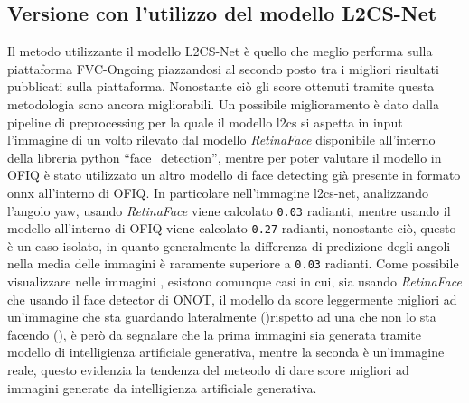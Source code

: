 \documentclass[12pt,a4paper,openright,twoside]{book}
\begin{document}
\subsection{Versione con l'utilizzo del modello L2CS-Net}
Il metodo utilizzante il modello L2CS-Net è quello che meglio performa sulla piattaforma FVC-Ongoing piazzandosi al secondo posto tra i migliori risultati pubblicati sulla piattaforma. Nonostante ciò gli score ottenuti tramite questa metodologia sono ancora migliorabili. Un possibile miglioramento è dato dalla pipeline di preprocessing per la quale il modello l2cs si aspetta in input l'immagine di un volto rilevato dal modello \textit{RetinaFace} disponibile all'interno della libreria python ``face\_detection'', mentre per poter valutare il modello in OFIQ è stato utilizzato un altro modello di face detecting già presente in formato onnx all'interno di OFIQ.
In particolare nell'immagine  l2cs-net, analizzando l'angolo yaw, usando \textit{RetinaFace} viene calcolato \texttt{0.03} radianti, mentre usando il modello all'interno di OFIQ viene calcolato \texttt{0.27} radianti, nonostante ciò, questo è un caso isolato, in quanto generalmente la differenza di predizione degli angoli nella media delle immagini è raramente superiore a \texttt{0.03} radianti.
Come possibile visualizzare nelle immagini , esistono comunque casi in cui, sia usando \textit{RetinaFace} che usando il face detector di ONOT, il modello da score leggermente migliori ad un'immagine che sta guardando lateralmente ()rispetto ad una che non lo sta facendo (), è però da segnalare che la prima immagini sia generata tramite modello di intelligienza artificiale generativa, mentre la seconda è un'immagine reale, questo evidenzia la tendenza del meteodo di dare score migliori ad immagini generate da intelligienza artificiale generativa.
\end{document}
